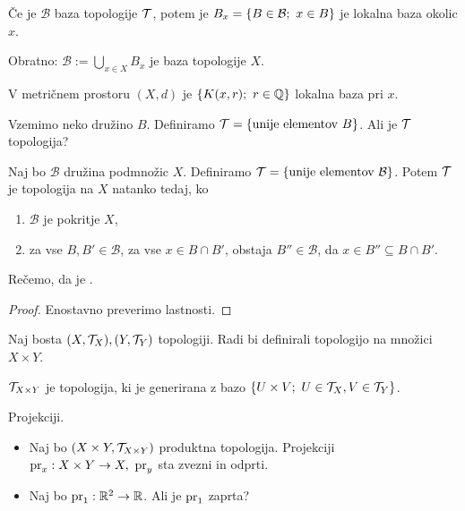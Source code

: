 \begin{trditev}
    Če je $\mathcal{B}$ baza topologije $\mathcal{T}$, potem je $B_x = \left\{B \in \mathcal{B}; \ x \in B\right\}$ je lokalna baza okolic $x$.

    Obratno: $\mathcal{B} := \bigcup_{x \in X} B_x$ je baza topologije $X$.
\end{trditev}

\begin{primer}
    V metričnem prostoru $(X, d)$ je $\left\{K(x,r); \ r \in \mathbb{Q}\right\}$ lokalna baza pri $x$.
\end{primer}

\newpage
Vzemimo neko družino $B$. Definiramo $\mathcal{T} = \left\{\text{unije elementov } B\right\}$. Ali je $\mathcal{T}$ topologija?

\begin{trditev}
    \label{trd:baza}
    Naj bo $\mathcal{B}$ družina podmnožic $X$. Definiramo $\mathcal{T} = \left\{\text{unije elementov } \mathcal{B}\right\}$. Potem $\mathcal{T}$ je topologija na $X$ natanko tedaj, ko
    \begin{enumerate}
        \item $\mathcal{B}$ je pokritje $X$,
        \item za vse $B, B' \in \mathcal{B}$, za vse $x \in B \cap B'$, obstaja $B'' \in \mathcal{B}$, da $x \in B'' \subseteq B \cap B'$.
    \end{enumerate} 
    Rečemo, da je .
\end{trditev}

\begin{proof}
    Enostavno preverimo lastnosti.
\end{proof}

Naj bosta $(X, \mathcal{T}_X), (Y, \mathcal{T}_Y)$ topologiji. Radi bi definirali topologijo na množici $X \times Y$.

\begin{definicija}
     $\mathcal{T}_{X \times Y}$ je topologija, ki je generirana z bazo $\left\{U \times V; \ U \in \mathcal{T}_X, V \in \mathcal{T}_Y\right\}$.
\end{definicija}

\begin{zgled} 
    Projekciji.
    \begin{itemize}
        \item Naj bo $(X \times Y, \mathcal{T}_{X \times Y})$ produktna topologija. Projekciji $\operatorname{pr}_x: X \times Y \to X, \ \operatorname{pr}_y$ sta zvezni in odprti.
        \item Naj bo $\operatorname{pr}_1: \mathbb{R}^2 \to \mathbb{R}$. Ali je $\operatorname{pr}_1$ zaprta?
    \end{itemize} 
\end{zgled}

